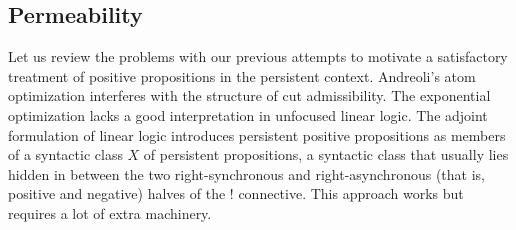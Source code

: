 

\subsection{Permeability}
\label{sec:permeable}

Let us review the problems with our previous attempts to motivate a
satisfactory treatment of positive propositions in the persistent
context.  Andreoli's atom optimization interferes with the structure
of cut admissibility. The exponential optimization lacks a good
interpretation in unfocused linear logic. The adjoint formulation of
linear logic introduces persistent positive propositions as members of
a syntactic class $X$ of persistent propositions, a syntactic class
that usually lies hidden in between the two right-synchronous and
right-asynchronous (that is, positive and negative) halves of the
${!}$ connective. This approach works but requires a lot of extra
machinery.

